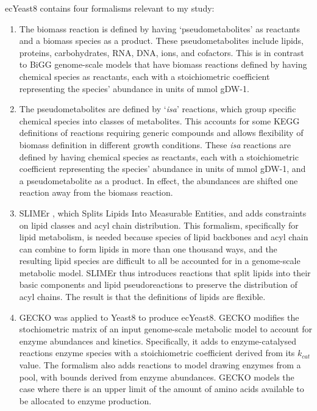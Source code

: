 ecYeast8 contains four formalisms relevant to my study:
\begin{enumerate}
  \item
        The biomass reaction is defined by having `pseudometabolites' as reactants and a biomass species as a product.
        These pseudometabolites include lipids, proteins, carbohydrates, RNA, DNA, ions, and cofactors.
        This is in contrast to BiGG genome-scale models that have biomass reactions defined by having chemical species as reactants, each with a stoichiometric coefficient representing the species' abundance in units of mmol gDW-1.
  \item
        The pseudometabolites are defined by `\emph{isa}' reactions, which group specific chemical species into classes of metabolites.
        This accounts for some KEGG definitions of reactions requiring generic compounds and allows flexibility of biomass definition in different growth conditions.
        These \emph{isa} reactions are defined by having chemical species as reactants, each with a stoichiometric coefficient representing the species' abundance in units of mmol gDW-1, and a pseudometabolite as a product.
        In effect, the abundances are shifted one reaction away from the biomass reaction.
  \item
        SLIMEr \parencite{sanchezSLIMErProbingFlexibility2019}, which Splits Lipids Into Measurable Entities, and adds constraints on lipid classes and acyl chain distribution.
        This formalism, specifically for lipid metabolism, is needed because species of lipid backbones and acyl chain can combine to form lipids in more than one thousand ways, and the resulting lipid species are difficult to all be accounted for in a genome-scale metabolic model.
        SLIMEr thus introduces reactions that split lipids into their basic components and lipid pseudoreactions to preserve the distribution of acyl chains.
        The result is that the definitions of lipids are flexible.
  \item
        GECKO was applied to Yeast8 to produce ecYeast8.  GECKO modifies the stochiometric matrix of an input genome-scale metabolic model to account for enzyme abundances and kinetics.
        Specifically, it adds to enzyme-catalysed reactions enzyme species with a stoichiometric coefficient derived from its $k_{cat}$ value.
        The formalism also adds reactions to model drawing enzymes from a pool, with bounds derived from enzyme abundances.  GECKO models the case where there is an upper limit of the amount of amino acids available to be allocated to enzyme production.
\end{enumerate}

